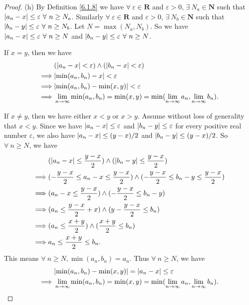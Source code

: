 \begin{proof}{(h)}
By Definition \ref{6.1.8} we have \(\forall\ \varepsilon \in \mathbf{R}\) and \(\varepsilon > 0\), \(\exists\ N_a \in \mathbf{N}\) such that \(\abs*{a_n - x} \leq \varepsilon \ \forall\ n \geq N_a\).
Similarly \(\forall\ \varepsilon \in \mathbf{R}\) and \(\varepsilon > 0\), \(\exists\ N_b \in \mathbf{N}\) such that \(\abs*{b_n - y} \leq \varepsilon \ \forall\ n \geq N_b\).
Let \(N = \max(N_a, N_b)\).
So we have \(\abs*{a_n - x} \leq \varepsilon \ \forall\ n \geq N\) and \(\abs*{b_n - y} \leq \varepsilon \ \forall\ n \geq N\).

If \(x = y\), then we have
\begin{align*}
& (\abs*{a_n - x} < \varepsilon) \land (\abs*{b_n - x} < \varepsilon) \\
\implies & \abs*{\min(a_n, b_n) - x} < \varepsilon \\
\implies & \abs*{\min(a_n, b_n) - \min(x, y)} < \varepsilon \\
\implies & \lim_{n \to \infty} \min(a_n, b_n) = \min(x, y) = \min(\lim_{n \to \infty} a_n, \lim_{n \to \infty} b_n).
\end{align*}

If \(x \neq y\), then we have either \(x < y\) or \(x > y\).
Assume without loss of generality that \(x < y\).
Since we have \(\abs*{a_n - x} \leq \varepsilon\) and \(\abs*{b_n - y} \leq \varepsilon\) for every positive real number \(\varepsilon\), we also have \(\abs*{a_n - x} \leq (y - x) / 2\) and \(\abs*{b_n - y} \leq (y - x) / 2\).
So \(\forall\ n \geq N\), we have
\begin{align*}
& (\abs*{a_n - x} \leq \frac{y - x}{2}) \land (\abs*{b_n - y} \leq \frac{y - x}{2}) \\
\implies & (-\frac{y - x}{2} \leq a_n - x \leq \frac{y - x}{2}) \land (-\frac{y - x}{2} \leq b_n - y \leq \frac{y - x}{2}) \\
\implies & (a_n - x \leq \frac{y - x}{2}) \land (-\frac{y - x}{2} \leq b_n - y) \\
\implies & (a_n \leq \frac{y - x}{2} + x) \land (y - \frac{y - x}{2} \leq b_n) \\
\implies & (a_n \leq \frac{x + y}{2}) \land (\frac{x + y}{2} \leq b_n) \\
\implies & a_n \leq \frac{x + y}{2} \leq b_n.
\end{align*}
This means \(\forall\ n \geq N, \min(a_n, b_n) = a_n\).
Thus \(\forall\ n \geq N\), we have
\begin{align*}
& \abs*{\min(a_n, b_n) - \min(x, y)} = \abs*{a_n - x} \leq \varepsilon \\
\implies & \lim_{n \to \infty} \min(a_n, b_n) = \min(x, y) = \min(\lim_{n \to \infty} a_n, \lim_{n \to \infty} b_n).
\end{align*}
\end{proof}

